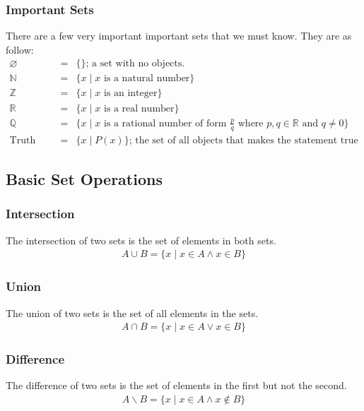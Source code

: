 \documentclass{article}
\begin{document}
\subsubsection{Important Sets}
There are a few very important important sets that we must know. They are as follow:
\begin{eqnarray} \nonumber
    \varnothing &=& \{\} \text{; a set with no objects.} \\ \nonumber
    \mathbb{N} &=& \{x \; | \; x \text{ is a natural number}\} \\ \nonumber
    \mathbb{Z} &=& \{x \; | \; x \text{ is an integer}\} \\ \nonumber
    \mathbb{R} &=& \{x \; | \; x \text{ is a real number}\} \\ \nonumber
    \mathbb{Q} &=& \{x \; | \; x \text{ is a rational number of form } \frac{p}{q} \text{ where } p,q \in \mathbb{R} \text{ and } q \neq 0\} \\ \nonumber
    \text{Truth Set} &=& \{ x \; | \; P(x) \} \text{; the set of all objects that makes the statement true}
\end{eqnarray}

\subsection{Basic Set Operations}
\subsubsection{Intersection}
The intersection of two sets is the set of elements in both sets.
\begin{eqnarray}
    A \cup B = \{x \; | \; x \in A \land x \in B\}
\end{eqnarray}

\subsubsection{Union}
The union of two sets is the set of all elements in the sets.
\begin{eqnarray}
    A \cap B = \{ x \; | \; x \in A \lor x \in B \}
\end{eqnarray}

\subsubsection{Difference}
The difference of two sets is the set of elements in the first but not the second.
\begin{eqnarray}
    A \backslash B = \{ x \; | \; x \in A \land x \notin B \}
\end{eqnarray}
\end{document}
